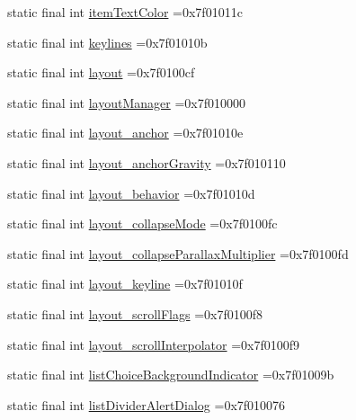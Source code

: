 \begin{DoxyCompactItemize}
\item 
static final int \hyperlink{classproject4_1_1xaria_1_1R_1_1attr_a5f7abe3d9281c4cd7fed8de7396fc015}{item\+Text\+Color} =0x7f01011c
\item 
static final int \hyperlink{classproject4_1_1xaria_1_1R_1_1attr_aabf98c4ea8ca8fc5fb46ca65843b864b}{keylines} =0x7f01010b
\item 
static final int \hyperlink{classproject4_1_1xaria_1_1R_1_1attr_aeaac1998aa821203d8671de8264b55b7}{layout} =0x7f0100cf
\item 
static final int \hyperlink{classproject4_1_1xaria_1_1R_1_1attr_ab2e15ebfa2ea2b892083b15b09eb6020}{layout\+Manager} =0x7f010000
\item 
static final int \hyperlink{classproject4_1_1xaria_1_1R_1_1attr_ab500d7f146cf628ea14cedaad13c94ea}{layout\+\_\+anchor} =0x7f01010e
\item 
static final int \hyperlink{classproject4_1_1xaria_1_1R_1_1attr_af45845ac0dcbc590638a6c9d97510b95}{layout\+\_\+anchor\+Gravity} =0x7f010110
\item 
static final int \hyperlink{classproject4_1_1xaria_1_1R_1_1attr_a32d21c5b495400a514a4b0be52384ee5}{layout\+\_\+behavior} =0x7f01010d
\item 
static final int \hyperlink{classproject4_1_1xaria_1_1R_1_1attr_a56c9c23c86ea1f70080c0ccbbf29c43a}{layout\+\_\+collapse\+Mode} =0x7f0100fc
\item 
static final int \hyperlink{classproject4_1_1xaria_1_1R_1_1attr_aecc13224b7a9bf26d49e3f3e21cb4302}{layout\+\_\+collapse\+Parallax\+Multiplier} =0x7f0100fd
\item 
static final int \hyperlink{classproject4_1_1xaria_1_1R_1_1attr_abcc3b4c704e84132d714bca10de69825}{layout\+\_\+keyline} =0x7f01010f
\item 
static final int \hyperlink{classproject4_1_1xaria_1_1R_1_1attr_a60eceb84cb6e25f5b094a8d58d247d93}{layout\+\_\+scroll\+Flags} =0x7f0100f8
\item 
static final int \hyperlink{classproject4_1_1xaria_1_1R_1_1attr_a93e084a800c058b77038bd341b19a69e}{layout\+\_\+scroll\+Interpolator} =0x7f0100f9
\item 
static final int \hyperlink{classproject4_1_1xaria_1_1R_1_1attr_a043b691e2e635971fec9407a85888364}{list\+Choice\+Background\+Indicator} =0x7f01009b
\item 
static final int \hyperlink{classproject4_1_1xaria_1_1R_1_1attr_aa4f36f6a7dac944117cabb85c635b34d}{list\+Divider\+Alert\+Dialog} =0x7f010076
\item 

\end{DoxyCompactItemize}
